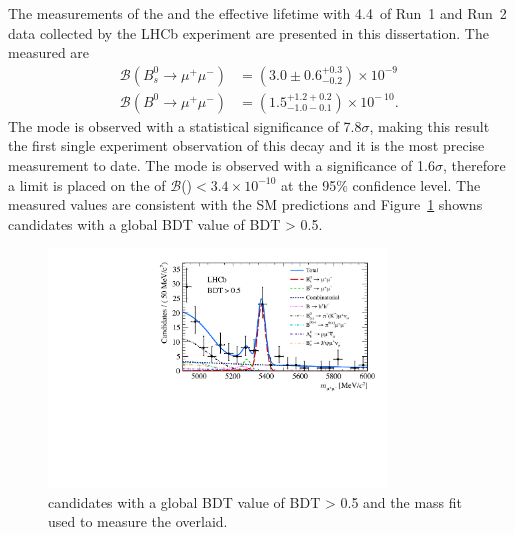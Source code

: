 The measurements of the \bmumu \BF and the \bsmumu effective lifetime with 4.4~\fb of Run~1 and Run~2 data collected by the LHCb experiment are presented in this dissertation. The measured \BFs are
\begin{equation}
\begin{split}
  \mathcal{B}(B^{0}_{s} \to \mu^{+} \mu^{-}) &= (3.0 \pm 0.6^{+0.3}_{-0.2}) \times 10^{-9\
} \\
  \mathcal{B}(B^{0} \to \mu^{+} \mu^{-}) &= (1.5^{+1.2 +0.2}_{-1.0 -0.1})    \times 10^{-\
10}.
\end{split}
\label{eq:BFresults2}
\end{equation}
The \bs mode is observed with a statistical significance of 7.8$\sigma$, making this result the first single experiment observation of this decay and it is the most precise measurement to date. The \bd mode is observed with a significance of 1.6$\sigma$, therefore a limit is placed on the \BF of $\mathcal{B}$(\bdmumu)$ < 3.4 \times 10^{-10}$ at the 95$\%$ confidence level. The measured values are consistent with the SM predictions and Figure~\ref{fig:BDT} showns \bmumu candidates with a global BDT value of BDT > 0.5. %
\begin{figure}[tbp]
    \centering
        \includegraphics[width=0.8\textwidth]{./Figs/Summary/BDT_plot.pdf}
    \caption{\bmumu candidates with a global BDT value of BDT > 0.5 and the mass fit used to measure the \bmumu \BFs overlaid.}
    \label{fig:BDT}
\end{figure}

